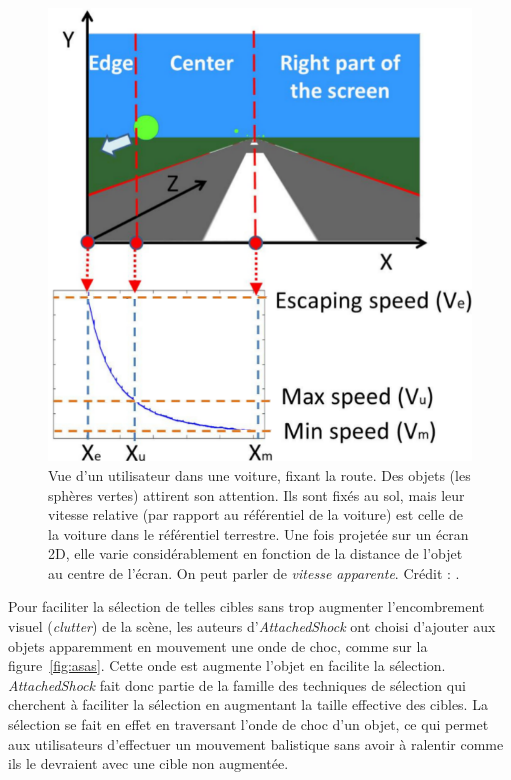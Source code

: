 	\begin{figure}
		\includegraphics[scale=0.35]{figures/ch2/as2dspeed}
		\caption[\emph{AttachedShock}, profil de vitesse]{Vue d'un utilisateur dans une voiture, fixant la route. Des objets (les sphères vertes) attirent son attention. Ils sont fixés au sol, mais leur vitesse relative (par rapport au référentiel de la voiture) est celle de la voiture dans le référentiel terrestre. Une fois projetée sur un écran 2D, elle varie considérablement en fonction de la distance de l'objet au centre de l'écran. On peut parler de \emph{vitesse apparente}. Crédit : \cite{you2012attachedshock}.}
		\label{fig:as2dspeed}	
	\end{figure}
	
	Pour faciliter la sélection de telles cibles sans trop augmenter l'encombrement visuel (\emph{clutter}) de la scène, les auteurs d'\emph{AttachedShock} ont choisi d'ajouter aux objets apparemment en mouvement une onde de choc, comme sur la figure~\ref{fig:asas}. Cette onde est augmente l'objet en facilite la sélection. \emph{AttachedShock} fait donc partie de la famille des techniques de sélection qui cherchent à faciliter la sélection en augmentant la taille effective des cibles. La sélection se fait en effet en \og traversant \fg{} l'onde de choc d'un objet, ce qui permet aux utilisateurs d'effectuer un mouvement balistique sans avoir à ralentir comme ils le devraient avec une cible non augmentée.
	
